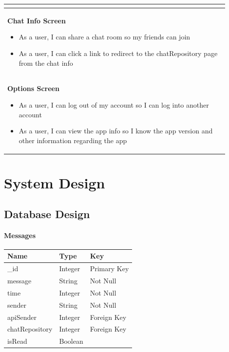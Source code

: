 \documentclass{report}
\begin{document}
\begin{center}
\begin{tabular}{ | p{0.9\linewidth} |}
\begin{itemize}
                            \end{itemize} \\
        \hline
        \textbf{Chat Info Screen}\begin{itemize}
                                     \item As a user, I can share a chat room so my friends can join
                                     \item As a user, I can click a link to redirect to the chatRepository page from the chat info
                                 \end{itemize}                                      \\
        \hline
        \textbf{Options Screen}\begin{itemize}
                                   \item As a user, I can log out of my account so I can log into another account
                                   \item As a user, I can view the app info so I know the app version and other information regarding the app

                               \end{itemize}                       \\
        \hline
    \end{tabular}
\end{center}

\chapter{System Design}

\section{Database Design}

\subsubsection{Messages}
\begin{tabular}{| l | l | l |}
    \hline
    \textbf{Name} & \textbf{Type} & \textbf{Key} \\
    \hline
    \hline
    \_id          & Integer       & Primary Key  \\
    \hline
    message       & String        & Not Null     \\
    \hline
    time          & Integer       & Not Null     \\
    \hline
    sender        & String        & Not Null     \\
    \hline
    apiSender     & Integer       & Foreign Key  \\
    \hline
    chatRepository    & Integer       & Foreign Key  \\
    \hline
    isRead        & Boolean       &              \\
    \hline
\end{tabular}
\end{document}
